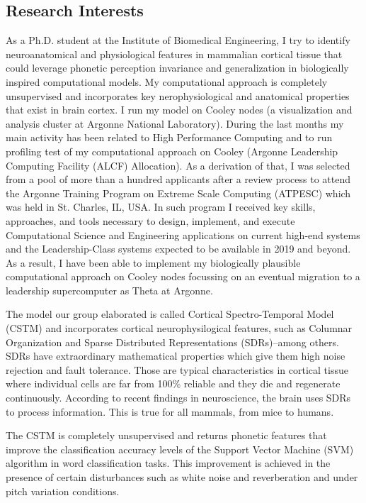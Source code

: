 \documentclass{article}
\begin{document}
\subsection*{Research Interests}

As a Ph.D. student at the Institute of Biomedical Engineering, I try to identify neuroanatomical and physiological features in mammalian cortical tissue that could leverage phonetic perception invariance and generalization in biologically inspired computational models. My computational approach is completely unsupervised and incorporates key nerophysiological and anatomical properties that exist in brain cortex. I run my model on Cooley nodes (a visualization and analysis cluster at Argonne National Laboratory). During the last months my main activity has been related to High Performance Computing and to run profiling test of my computational approach on Cooley (Argonne Leadership Computing Facility (ALCF) Allocation). As a derivation of that, I was selected from a pool of more than a hundred applicants after a review process to attend the Argonne Training Program on Extreme Scale Computing (ATPESC) which was held in St. Charles, IL, USA. In such program I received key skills, approaches, and tools necessary to design, implement, and execute Computational Science and Engineering applications on current high-end systems and the Leadership-Class systems expected to be available in 2019 and beyond. As a result, I have been able to implement my biologically plausible computational approach on Cooley nodes focussing on an eventual migration to a leadership supercomputer as Theta at Argonne.

The model our group elaborated is called Cortical Spectro-Temporal Model (CSTM) and incorporates cortical neurophysilogical features, such as Columnar Organization and Sparse Distributed Representations (SDRs)--among others. SDRs have extraordinary mathematical properties which give them high noise rejection and fault tolerance. Those are typical characteristics in cortical tissue where individual cells are far from 100\% reliable and they die and regenerate continuously. According to recent findings in neuroscience, the brain uses SDRs to process information. This is true for all mammals, from mice to humans.

The CSTM is completely unsupervised and returns phonetic features that improve the classification accuracy levels of the Support Vector Machine (SVM) algorithm in word classification tasks. This improvement is achieved in the presence of certain disturbances such as white noise and reverberation and under pitch variation conditions.
\end{document}
